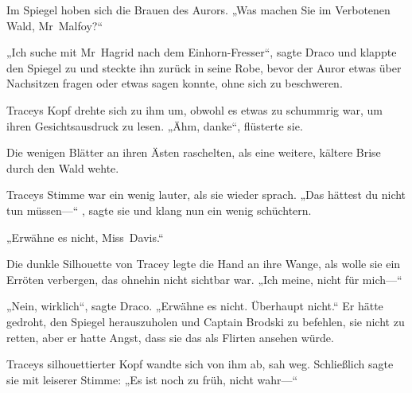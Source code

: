 Im Spiegel hoben sich die Brauen des Aurors. „Was machen Sie im Verbotenen Wald, Mr~Malfoy?“

„Ich suche mit Mr~Hagrid nach dem Einhorn-Fresser“, sagte Draco und klappte den Spiegel zu und steckte ihn zurück in seine Robe, bevor der Auror etwas über Nachsitzen fragen oder etwas sagen konnte, ohne sich zu beschweren.

Traceys Kopf drehte sich zu ihm um, obwohl es etwas zu schummrig war, um ihren Gesichtsausdruck zu lesen. „Ähm, danke“, flüsterte sie.

Die wenigen Blätter an ihren Ästen raschelten, als eine weitere, kältere Brise durch den Wald wehte.

Traceys Stimme war ein wenig lauter, als sie wieder sprach. „Das hättest du nicht tun müssen—“ , sagte sie und klang nun ein wenig schüchtern.

„Erwähne es nicht, Miss~Davis.“

Die dunkle Silhouette von Tracey legte die Hand an ihre Wange, als wolle sie ein Erröten verbergen, das ohnehin nicht sichtbar war. „Ich meine, nicht für mich—“

„Nein, wirklich“, sagte Draco. „Erwähne es nicht. Überhaupt nicht.“
Er hätte gedroht, den Spiegel herauszuholen und Captain Brodski zu befehlen, sie nicht zu retten, aber er hatte Angst, dass sie das als Flirten ansehen würde.

Traceys silhouettierter Kopf wandte sich von ihm ab, sah weg. Schließlich sagte sie mit leiserer Stimme: „Es ist noch zu früh, nicht wahr—“

